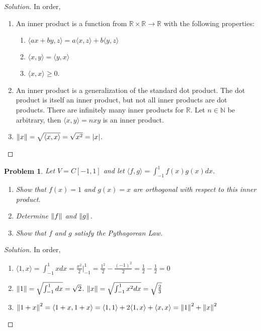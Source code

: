 \documentclass{article}
\theoremstyle{mystyle}
\newtheorem{problem}{Problem}[section]
\begin{document}
\begin{proof}[Solution]
In order,
\begin{enumerate}
    \item An inner product is a function from $\mathbb{R}\times \mathbb{R}\rightarrow \mathbb{R}$ with the following properties:
    \begin{enumerate}
        \item $\langle ax+by,z\rangle = a\langle x,z\rangle+b\langle y,z\rangle$
        \item $\langle x,y\rangle = \langle y,x \rangle$
        \item $\langle x,x\rangle \geq 0$.
    \end{enumerate}
    \item An inner product is a generalization of the standard dot product. The dot product is itself an inner product, but not all inner products are dot products. There are infinitely many inner products for $\mathbb{R}$. Let $n\in \mathbb{N}$ be arbitrary, then $\langle x,y \rangle = nxy$ is an inner product.
    \item $\norm{x} = \sqrt{\langle x,x \rangle } = \sqrt{x^2}= |x|$.
\end{enumerate}
\end{proof}
\begin{problem}
Let $V = C[-1,1]$ and let $\langle f,g\rangle = \int_{-1}^{1} f(x)g(x)dx$.
\begin{enumerate}
    \item Show that $f(x)=1$ and $g(x) = x$ are orthogonal with respect to this inner product.
    \item Determine $\norm{f}$ and $\norm{g}$.
    \item Show that $f$ and $g$ satisfy the Pythagorean Law.
\end{enumerate}
\end{problem}
\begin{proof}[Solution]
In order,
\begin{enumerate}
    \item $\langle 1,x\rangle = \int_{-1}^{1} xdx = \frac{x^2}{2}\big|_{-1}^{1} = \frac{1^2}{2}-\frac{(-1)^2}{2} = \frac{1}{2}-\frac{1}{2} = 0$
    \item $\norm{1} = \sqrt{ \int_{-1}^{1} dx} = \sqrt{2}$. $\norm{x} = \sqrt{\int_{-1}^{1}x^2dx} = \sqrt{\frac{2}{3}}$
    \item $\norm{1+x}^2 = \langle 1+x,1+x\rangle = \langle 1,1\rangle + 2\langle 1,x \rangle + \langle x,x\rangle = \norm{1}^2 + \norm{x}^2$
\end{enumerate}
\end{proof}
\end{document}
